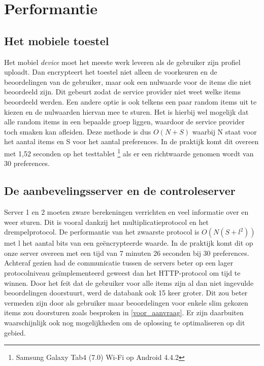 \section{Performantie}
\subsection{Het mobiele toestel}
Het mobiel \emph{device} moet het meeste werk leveren als de gebruiker zijn profiel uploadt. Dan encrypteert het toestel niet alleen de voorkeuren en de beoordelingen van de gebruiker, maar ook een nulwaarde voor de items die niet beoordeeld zijn. Dit gebeurt zodat de service provider niet weet welke items beoordeeld werden. Een andere optie is ook telkens een paar random items uit te kiezen en de nulwaarden hiervan mee te sturen. Het is hierbij wel mogelijk dat alle random items in een bepaalde groep liggen, waardoor de service provider toch smaken kan afleiden. Deze methode is dus $O(N+S)$ waarbij N staat voor het aantal items en S voor het aantal preferences.
In de praktijk komt dit overeen met 1,52 seconden op het testtablet \footnote{Samsung Galaxy Tab4 (7.0) Wi-Fi op Android 4.4.2} als er een richtwaarde genomen wordt van 30 preferences. 

\subsection{De aanbevelingsserver en de controleserver}
Server 1 en 2 moeten zware berekeningen verrichten en veel informatie over en weer sturen. Dit is vooral dankzij het multiplicatieprotocol en het drempelprotocol. De performantie van het zwaarste protocol is $O(N(S+l^2))$ met l het aantal bits van een ge\"encrypteerde waarde. In de praktijk komt dit op onze server overeen met een tijd van 7 minuten 26 seconden bij 30 preferences. Achteraf gezien had de communicatie tussen de servers beter op een lager protocolniveau ge\"implementeerd geweest dan het HTTP-protocol om tijd te winnen. Door het feit dat de gebruiker voor alle items zijn al dan niet ingevulde beoordelingen doorstuurt, werd de databank ook 15 keer groter. Dit zou beter vermeden zijn door als gebruiker maar beoordelingen voor enkele slim gekozen items zou doorsturen zoals besproken in \ref{voor_aanvraag}. Er zijn daarbuiten waarschijnlijk ook nog mogelijkheden om de oplossing te optimaliseren op dit gebied.